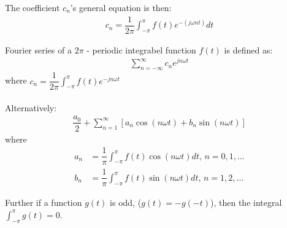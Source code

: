 The coefficient $c_n$'s general equation is then:
\begin{align*}
	c_n = \dfrac{1}{2\pi} \int_{-\pi}^{\pi} f(t) e^{-(j \omega nt)}dt
\end{align*} 
\begin{definition} \label{def:fourier_definition}
Fourier series of a $2\pi$ - periodic integrabel function $f(t)$ is defined as:
\begin{align*}
	\sum_{n=-\infty}^\infty c_n e^{j n \omega t}
\end{align*}
where $c_n = \dfrac{1}{2\pi}\int_{- \pi}^\pi f(t) e^{-j n \omega t}$
\\\\
Alternatively:
\begin{align*}
	\dfrac{a_0}{2} + \sum_{n=1}^{\infty} \left[ a_n \cos(n \omega t) + b_n \sin(n \omega t)\right]
\end{align*} 
where
\begin{align*}
	a_n 
	&= \dfrac{1}{\pi} \int_{-\pi}^\pi f(t) \cos (n \omega t) dt, \, n=0,1,\dots\\
	b_n
	&= \dfrac{1}{\pi} \int_{-\pi}^\pi f(t) \sin (n \omega t) dt, \, n=1,2,\dots	
\end{align*}
\end{definition}
Further if a function $g(t)$ is odd, ($g(t) = -g(-t)$), then the integral $\int_{-\pi}^\pi g(t) = 0$.
